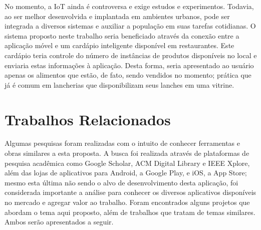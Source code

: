 No momento, a IoT ainda é controversa e exige estudos e experimentos. Todavia, ao ser melhor desenvolvida e implantada em ambientes urbanos, pode ser integrada a diversos sistemas e auxiliar a população em suas tarefas cotidianas. O sistema proposto neste trabalho seria beneficiado através da conexão entre a aplicação móvel e um cardápio inteligente disponível em restaurantes. Este cardápio teria controle do número de instâncias de produtos disponíveis no local e enviaria estas informações à aplicação. Desta forma, seria apresentado ao usuário apenas os alimentos que estão, de fato, sendo vendidos no momento; prática que já é comum em lancherias que disponibilizam seus lanches em uma vitrine.


\section{Trabalhos Relacionados}
Algumas pesquisas foram realizadas com o intuito de conhecer ferramentas e obras similares a esta proposta. A busca foi realizada através de plataformas de pesquisa acadêmica como Google Scholar, ACM Digital Library e IEEE Xplore, além das lojas de aplicativos para Android, a Google Play, e iOS, a App Store; mesmo esta última não sendo o alvo de desenvolvimento desta aplicação, foi considerada importante a análise para conhecer os diversos aplicativos disponíveis no mercado e agregar valor ao trabalho. Foram encontrados alguns projetos que abordam o tema aqui proposto, além de trabalhos que tratam de temas similares. Ambos serão apresentados a seguir.


